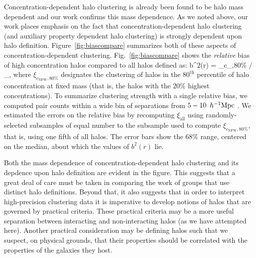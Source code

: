 \documentclass[usenatbib,fleqn]{mnras}
\begin{document}
Concentration-dependent halo clustering is already been found to be halo mass dependent and our work confirms this mass dependence. As we noted above, our work places emphasis on the fact that concentration-dependent halo clustering (and auxiliary property dependent halo clustering) is strongly dependent upon halo definition. Figure~\ref{fig:biascompare} summarizes both of these aspects of concentration-dependent clustering. Fig.~\ref{fig:biascompare} shows the {\em relative} bias of high concentration halos compared to all halos defined as: 
\beq
b^2(r) = \xi_{c_,80\%} / \xi_{},
\eeq
where $\xi_{c_\mathrm{NFW},80\%}$ designates the clustering of halos in the $80^{\mathrm{th}}$ percentile of halo concentration at fixed mass (that is, the halos with the $20\%$ highest concentrations). To summarize clustering 
strength with a single relative bias, we computed pair counts within a wide bin of separations from $5-10\, \ h^{-1}\mathrm{Mpc}~$. We estimated the errors on the relative bias by recomputing $\xi_{\mathrm{all}}$ using randomly-selected subsamples of equal number to the subsample used to compute $\xi_{c_{\mathrm{NFW}},80\%}$, that is, using one fifth of all halos. 
The error bars show the $68\%$ range, centered on the median, about which the values of $b^2(r)$ lie. 

Both the mass dependence of concentration-dependent halo clustering and its depdence upon halo definition are evident in the figure. This suggests that a great deal of care must be taken in comparing the work of groups that use distinct halo definitions. Beyond that, it also suggests that in order to interpret high-precision clustering data it is imperative to develop notions of halos that are governed by practical criteria. These practical criteria may be a more useful separation between interacting and non-interacting halos (as we have attempted here). Another practical consideration may be defining halos such that we suspect, on physical grounds, that their properties should be correlated with the properties of the galaxies they host. 
\end{document}
